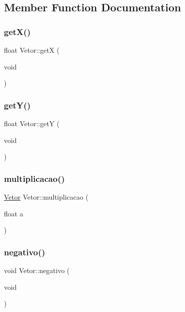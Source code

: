 \subsection{Member Function Documentation}
\mbox{\label{class_vetor_a0b43068a518a1b9e42a2031aa6c41f0d}} 
\subsubsection{\texorpdfstring{get\+X()}{getX()}}
{\footnotesize\ttfamily float Vetor\+::getX (\begin{DoxyParamCaption}\item[{void}]{ }\end{DoxyParamCaption})}

\mbox{\label{class_vetor_aec52a87477cfeb998a1668abae852373}} 
\subsubsection{\texorpdfstring{get\+Y()}{getY()}}
{\footnotesize\ttfamily float Vetor\+::getY (\begin{DoxyParamCaption}\item[{void}]{ }\end{DoxyParamCaption})}

\mbox{\label{class_vetor_a3d3822b8ee1525b724b15db40d798ec7}} 
\subsubsection{\texorpdfstring{multiplicacao()}{multiplicacao()}}
{\footnotesize\ttfamily \hyperlink{class_vetor}{Vetor} Vetor\+::multiplicacao (\begin{DoxyParamCaption}\item[{float}]{a }\end{DoxyParamCaption})}

\mbox{\label{class_vetor_a77932d982688b592b82c189e08ad94d1}} 
\subsubsection{\texorpdfstring{negativo()}{negativo()}\hspace{0.1cm}{\footnotesize\ttfamily [1/2]}}
{\footnotesize\ttfamily void Vetor\+::negativo (\begin{DoxyParamCaption}\item[{void}]{ }\end{DoxyParamCaption})}

